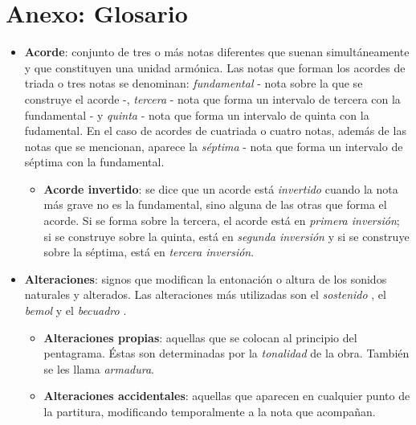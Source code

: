 \chapter*{Anexo: Glosario}
\label{glosario}


\begin{itemize}[label={}, leftmargin=*]
	
	\label{acorde}
	\item \textbf{Acorde}: conjunto de tres o más notas diferentes que suenan simultáneamente y que constituyen una unidad armónica. Las notas que forman los acordes de triada o tres notas se denominan: \textit{fundamental} - nota sobre la que se construye el acorde -,  \textit{tercera} - nota que forma un intervalo de tercera con la fundamental - y \textit{quinta} - nota que forma un intervalo de quinta con la fudamental. En el caso de acordes de cuatriada o cuatro notas, además de las notas que se mencionan, aparece la \textit{séptima} - nota que forma un intervalo de séptima con la fundamental.

	\begin{itemize}

			\label{inversion}
			\item \textbf{Acorde invertido}: se dice que un acorde está \textit{invertido} cuando la nota más grave no es la fundamental, sino alguna de las otras que forma el acorde. Si se forma sobre la tercera, el acorde está en \textit{primera inversión}; si se construye sobre la quinta, está en \textit{segunda inversión} y si se construye sobre la séptima, está en \textit{tercera inversión}.

	\end{itemize}

	\bigskip

	\label{alteracion}
	\item \textbf{Alteraciones}: signos que modifican la entonación o altura de los sonidos naturales y alterados. Las alteraciones más utilizadas son el \textit{sostenido} \sharp{} , el \textit{bemol} \flat{} y el \textit{becuadro} \natural{}. 

	\begin{itemize}

		\item \textbf{Alteraciones propias}: aquellas que se colocan al principio del pentagrama. Éstas son determinadas por la \textit{tonalidad} de la obra. También se les llama \textit{armadura}.

		\label{accidental}
		\item \textbf{Alteraciones accidentales}: aquellas que aparecen en cualquier punto de la partitura, modificando temporalmente a la nota que acompañan.


\end{itemize}
\end{itemize}
